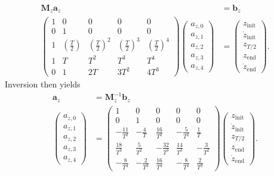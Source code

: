 \begin{align}
	\bm{M}_z\bm{a}_z &= \bm{b}_z \\
	\begin{pmatrix}
		1 & 0 & 0              & 0              & 0 \\
		0 & 1 & 0              & 0              & 0 \\
		1 & \left(\frac{T}{2}\right)        & \left(\frac{T}{2}\right)^2  & \left(\frac{T}{2}\right)^3 & \left(\frac{T}{2}\right)^4 \\
		1 & T & T^2            & T^3            & T^4 \\
		0 & 1 & 2T             & 3T^2           & 4T^3 
	\end{pmatrix}
	\begin{pmatrix}
		a_{z,0} \\
		a_{z,1} \\
		a_{z,2} \\
		a_{z,3} \\
		a_{z,4}
	\end{pmatrix} &=
	\begin{pmatrix}
		z_\text{init} \\
		\dot{z}_\text{init} \\
		z_{T/2} \\
		z_\text{end}\\
		\dot{z}_\text{end}
	\end{pmatrix}.
\end{align}
Inversion then yields
\begin{align}
	\bm{a}_z&=\bm{M}_z^{-1}\bm{b}_z \\
	\begin{pmatrix}
		a_{z,0} \\
		a_{z,1} \\
		a_{z,2} \\
		a_{z,3} \\
		a_{z,4}
	\end{pmatrix} &=
	\begin{pmatrix}
		1 & 0 & 0 & 0 & 0 \\
		0 & 1 & 0 & 0 & 0 \\
		-\frac{11}{T^2} & -\frac{4}{T} & \frac{16}{T^2} & -\frac{5}{T^2} & \frac{1}{T} \\
		\frac{18}{T^3} & \frac{5}{T^2} & -\frac{32}{T^3} & \frac{14}{T^3} & -\frac{3}{T^2} \\
		-\frac{8}{T^4} & -\frac{2}{T^3} & \frac{16}{T^4} & -\frac{8}{T^4} & \frac{2}{T^3}
	\end{pmatrix}
	\begin{pmatrix}
		z_\text{init} \\
		\dot{z}_\text{init} \\
		z_{T/2} \\
		z_\text{end}\\
		\dot{z}_\text{end}
	\end{pmatrix}.
\end{align}
